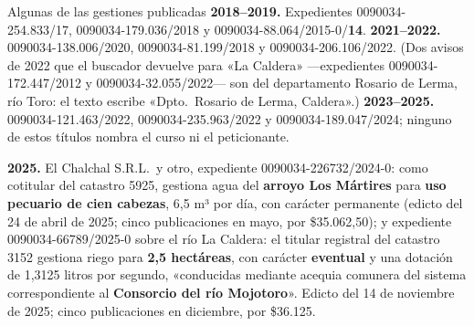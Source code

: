 \begin{ficha}{Algunas de las gestiones publicadas}
\textbf{2018--2019.} Expedientes 0090034-254.833/17, 0090034-179.036/2018 y 0090034-88.064/2015-0/\textbf{14}. \textbf{2021--2022.} 0090034-138.006/2020, 0090034-81.199/2018 y 0090034-206.106/2022. (Dos avisos de 2022 que el buscador devuelve para «La Caldera» ---expedientes 0090034-172.447/2012 y 0090034-32.055/2022--- son del departamento Rosario de Lerma, río Toro: el texto escribe «Dpto.\ Rosario de Lerma, Caldera».) \textbf{2023--2025.} 0090034-121.463/2022, 0090034-235.963/2022 y 0090034-189.047/2024; ninguno de estos títulos nombra el curso ni el peticionante.

\textbf{2025.} El Chalchal S.R.L.\ y otro, expediente 0090034-226732/2024-0: como cotitular del catastro 5925, gestiona agua del \textbf{arroyo Los Mártires} para \textbf{uso pecuario de cien cabezas}, 6,5 m³ por día, con carácter permanente (edicto del 24 de abril de 2025; cinco publicaciones en mayo, por \$35.062,50); y expediente
0090034-66789/2025-0 sobre el río La Caldera: el titular registral del catastro 3152 gestiona riego para \textbf{2,5 hectáreas}, con carácter \textbf{eventual} y una dotación de 1,3125 litros por segundo, «conducidas mediante acequia comunera del sistema correspondiente al \textbf{Consorcio del río Mojotoro}». Edicto del 14 de noviembre de 2025; cinco publicaciones en diciembre, por \$36.125.
\end{ficha}

